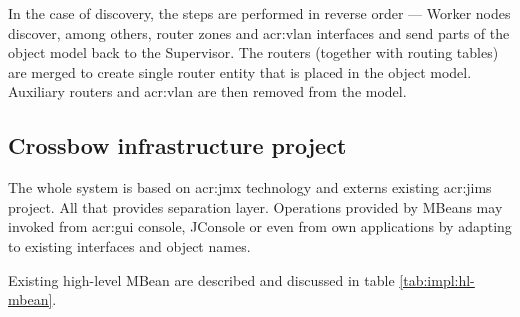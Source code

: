 \documentclass[11pt,openany]{book}
\begin{document}
          In the case of discovery, the steps are performed in reverse order --- Worker nodes discover, among others,
          router zones and \gls{acr:vlan} interfaces and send parts of the object model back to the Supervisor. The
          routers (together with routing tables) are merged to create single router entity that is placed in the object
          model. Auxiliary routers and \gls{acr:vlan} are then removed from the model.


      \subsection{Crossbow infrastructure project}
      \label{sec:impl:infrastructure}

        The whole system is based on \gls{acr:jmx} technology and externs  existing \gls{acr:jims}
        project. All that provides separation layer. Operations provided by MBeans may invoked from 
        \gls{acr:gui} console, JConsole or even from own applications by adapting to existing interfaces and object names. 

        Existing high-level MBean are described and discussed in table \ref{tab:impl:hl-mbean}.
\end{document}
